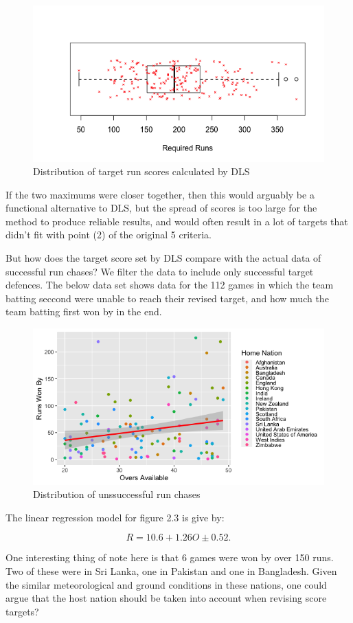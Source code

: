 \begin{figure}[h]
    \centering
    \includegraphics[scale=0.6]{figures/targetRunSpread.png}
    \caption{Distribution of target run scores calculated by DLS}
    \label{figure 2.2}
\end{figure}

If the two maximums were closer together, then this would arguably be a functional alternative to DLS, but the spread of scores is too large for the method to produce reliable results, and would often
result in a lot of targets that didn't fit with point (2) of the original 5 criteria. \newline

But how does the target score set by DLS compare with the actual data of successful run chases? We filter the data to include only successful target defences. The below data set shows data for the 112
games in which the team batting seccond were unable to reach their revised target, and how much the team batting first won by in the end.

\begin{figure}[h]
    \centering
    \includegraphics[scale=0.6]{figures/runsWonBy.png}
    \caption{Distribution of unssuccessful run chases}
    \label{figure 2.3}
\end{figure}

The linear regression model for figure 2.3 is give by:

\begin{equation}
    R = 10.6 + 1.26O \pm 0.52.
\end{equation}

One interesting thing of note here is that 6 games were won by over 150 runs. Two of these were in Sri Lanka, one in Pakistan and one in Bangladesh. Given the similar meteorological and ground conditions
in these nations, one could argue that the host nation should be taken into account when revising score targets?